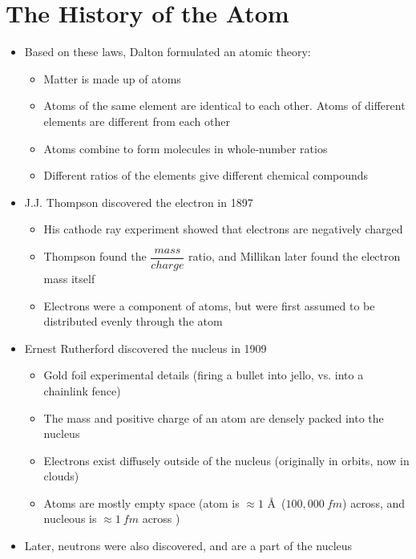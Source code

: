 \documentclass[12pt, openany, letterpaper]{memoir}
\begin{document}
\section{The History of the Atom}
\begin{itemize}
	\item Based on these laws, Dalton formulated an atomic theory:
	\begin{itemize}
		\item Matter is made up of atoms
		\item Atoms of the same element are identical to each other. Atoms of different elements are different from each other
		\item Atoms combine to form molecules in whole-number ratios
		\item Different ratios of the elements give different chemical compounds
	\end{itemize}
	\item J.J. Thompson discovered the electron in 1897
	\begin{itemize}
		\item His cathode ray experiment showed that electrons are negatively charged
		\item Thompson found the $\dfrac{mass}{charge}$ ratio, and Millikan later found the electron mass itself
		\item Electrons were a component of atoms, but were first assumed to be distributed evenly through the atom
	\end{itemize}
	\item Ernest Rutherford discovered the nucleus in 1909
	\begin{itemize}
		\item Gold foil experimental details (firing a bullet into jello, vs. into a chainlink fence)
		\item The mass and positive charge of an atom are densely packed into the nucleus
		\item Electrons exist diffusely outside of the nucleus (originally in orbits, now in clouds)
		\item Atoms are mostly empty space (atom is $\approx 1$ \AA ~($100,000~fm$) across, and nucleous is $\approx 1~fm$ across )
	\end{itemize}
	\item Later, neutrons were also discovered, and are a part of the nucleus
\end{itemize}
\end{document}
